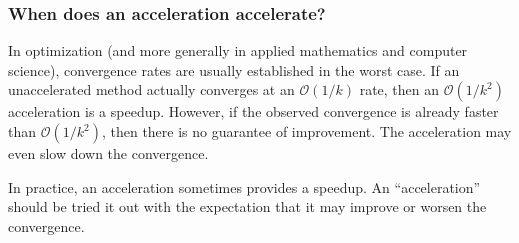 \documentclass[10pt,mathserif]{beamer}
\begin{document}
\begin{frame}
\frametitle{When does an acceleration accelerate?}
In optimization (and more generally in applied mathematics and computer science), convergence rates are usually established in the worst case.
If an unaccelerated method actually converges at an $\mathcal{O}(1/k)$ rate, then an $\mathcal{O}(1/k^2)$ acceleration is a speedup.
However, if the observed convergence is already faster than $\mathcal{O}(1/k^2)$, then there is no guarantee of improvement. The acceleration may even slow down the convergence.


\vspace{0.2in}

In practice, an acceleration sometimes provides a speedup.
An ``acceleration'' should be tried it out with the expectation that it may improve or worsen the convergence.
\end{frame}
\end{document}
